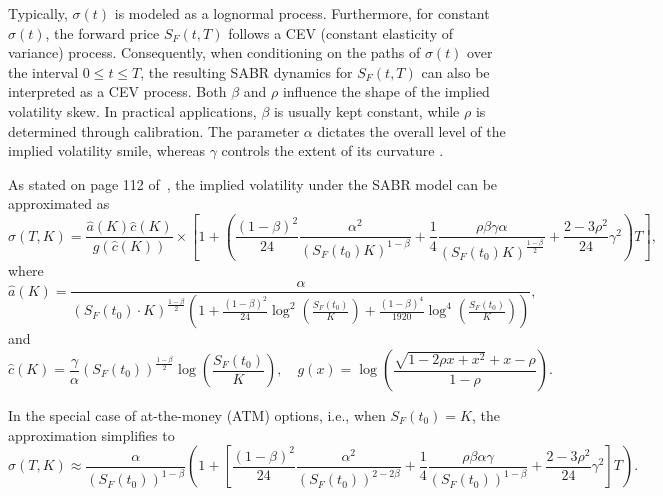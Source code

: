 \documentclass{article}
\begin{document}
{Typically, $\sigma(t)$ is modeled as a lognormal process. Furthermore, for constant $\sigma(t)$, the forward price $S_F(t,T)$ follows a CEV (constant elasticity of variance) process. Consequently, when conditioning on the paths of $\sigma(t)$ over the interval $0 \leq t \leq T$, the resulting SABR dynamics for $S_F(t,T)$ can also be interpreted as a CEV process. Both \(\beta\) and \(\rho\) influence the shape of the implied volatility skew. In practical applications, \(\beta\) is usually kept constant, while \(\rho\) is determined through calibration. The parameter \(\alpha\) dictates the overall level of the implied volatility smile, whereas \(\gamma\) controls the extent of its curvature \cite{oosterlee2019mathematical}.

As stated on page 112 of~\cite{oosterlee2019mathematical}, the implied volatility under the SABR model can be approximated as
\begin{equation}
\label{eq:sabr_iv}
    \hat{\sigma}(T,K)=\frac{\hat{a}(K)\hat{c}(K)}{g(\hat{c}(K))}
    \times\left[1+\left(\frac{(1 - \beta)^2}{24}\frac{\alpha^2}{(S_F(t_0)K)^{1 - \beta}}+\frac{1}{4}\frac{\rho\beta\gamma\alpha}{(S_F(t_0)K)^{\frac{1 - \beta}{2}}}+\frac{2 - 3\rho^2}{24}\gamma^2\right)T\right],
\end{equation}
where
\begin{equation}
\label{eq:a_hat}
    \hat{a}(K)=\frac{\alpha}{(S_F(t_0)\cdot K)^{\frac{1 - \beta}{2}}\left(1+\frac{(1 - \beta)^2}{24}\log^2\left(\frac{S_F(t_0)}{K}\right)+\frac{(1 - \beta)^4}{1920}\log^4\left(\frac{S_F(t_0)}{K}\right)\right)},
\end{equation}
and
\begin{equation}
\label{eq:c_hat}
    \hat{c}(K)=\frac{\gamma}{\alpha}(S_F(t_0))^{\frac{1 - \beta}{2}}\log\left(\frac{S_F(t_0)}{K}\right), \quad g(x)=\log\left(\frac{\sqrt{1 - 2\rho x+x^2}+x - \rho}{1 - \rho}\right).
\end{equation}

In the special case of at-the-money (ATM) options, i.e., when \(S_F(t_0) = K\), the approximation simplifies to
\begin{equation}
\label{eq:sabr_iv_atm}
    \hat{\sigma}(T,K)\approx\frac{\alpha}{(S_F(t_0))^{1 - \beta}}\left(1+\left[\frac{(1 - \beta)^2}{24}\frac{\alpha^2}{(S_F(t_0))^{2 - 2\beta}} + \frac{1}{4}\frac{\rho\beta\alpha\gamma}{(S_F(t_0))^{1 - \beta}} + \frac{2 - 3\rho^2}{24}\gamma^2\right]T\right).
\end{equation}

}
\end{document}
